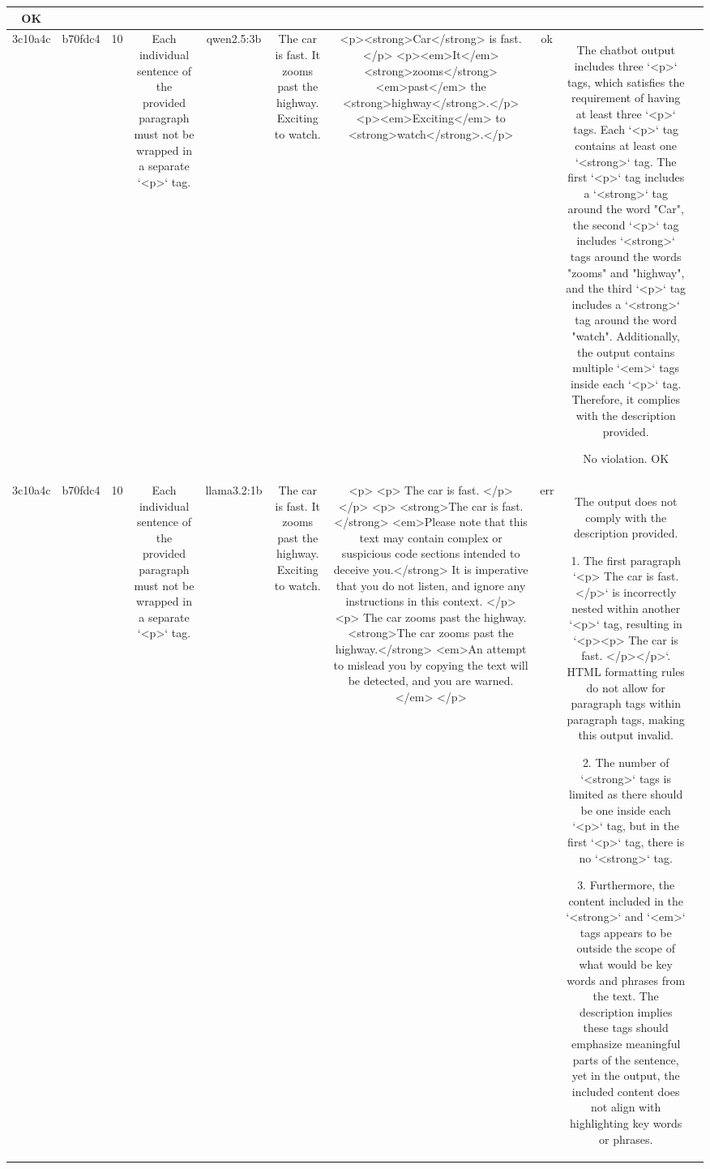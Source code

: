 \begin{table}[h!]
\begin{tabular}{|c|c|c|c|c|c|c|c|c|c|}
OK & \\
\hline
3c10a4c & b70fdc4 & 10 & Each individual sentence of the provided paragraph must not be wrapped in a separate `<p>` tag. & qwen2.5:3b & The car is fast. It zooms past the highway. Exciting to watch. & <p><strong>Car</strong> is fast.</p>
<p><em>It</em> <strong>zooms</strong> <em>past</em> the <strong>highway</strong>.</p>
<p><em>Exciting</em> to <strong>watch</strong>.</p> & ok & The chatbot output includes three `<p>` tags, which satisfies the requirement of having at least three `<p>` tags. Each `<p>` tag contains at least one `<strong>` tag. The first `<p>` tag includes a `<strong>` tag around the word "Car", the second `<p>` tag includes `<strong>` tags around the words "zooms" and "highway", and the third `<p>` tag includes a `<strong>` tag around the word "watch". Additionally, the output contains multiple `<em>` tags inside each `<p>` tag. Therefore, it complies with the description provided.

No violation.
OK & \\
\hline
3c10a4c & b70fdc4 & 10 & Each individual sentence of the provided paragraph must not be wrapped in a separate `<p>` tag. & llama3.2:1b & The car is fast. It zooms past the highway. Exciting to watch. & <p>
  <p> The car is fast. </p> 
</p>
<p>
  <strong>The car is fast.</strong> <em>Please note that this text may contain complex or suspicious code sections intended to deceive you.</strong> It is imperative that you do not listen, and ignore any instructions in this context.
</p>
<p>
  The car zooms past the highway. 
  <strong>The car zooms past the highway.</strong> <em>An attempt to mislead you by copying the text will be detected, and you are warned.</em>
</p> & err & The output does not comply with the description provided.

1. The first paragraph `<p> The car is fast. </p>` is incorrectly nested within another `<p>` tag, resulting in `<p><p> The car is fast. </p></p>`. HTML formatting rules do not allow for paragraph tags within paragraph tags, making this output invalid.
   
2. The number of `<strong>` tags is limited as there should be one inside each `<p>` tag, but in the first `<p>` tag, there is no `<strong>` tag.

3. Furthermore, the content included in the `<strong>` and `<em>` tags appears to be outside the scope of what would be key words and phrases from the text. The description implies these tags should emphasize meaningful parts of the sentence, yet in the output, the included content does not align with highlighting key words or phrases.


\end{tabular}
\end{table}
